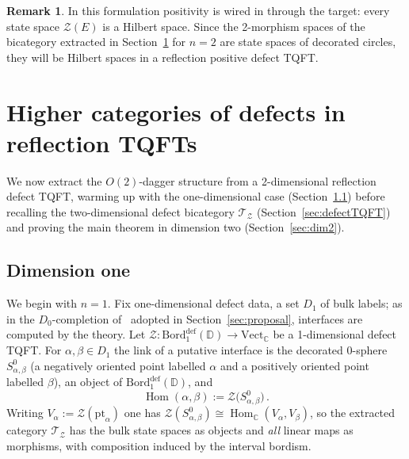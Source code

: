 \documentclass[11pt]{article}
\theoremstyle{definition}
\newtheorem{remark}[theorem]{Remark}
\newcommand{\cT}{\mathcal{T}}
\newcommand{\cZ}{\mathcal{Z}}
\newcommand{\bC}{\mathbb{C}}
\newcommand{\bD}{\mathbb{D}}
\newcommand{\Bord}{\mathrm{Bord}}
\newcommand{\Vect}{\mathrm{Vect}}
\newcommand{\Or}{O} %
\begin{document}
\begin{remark}
\label{rem:positivityforfree}
In this formulation positivity is wired in through the target: every state space $\cZ(E)$ is a Hilbert space. Since the 2-morphism spaces of the bicategory extracted in Section~\ref{sec:extractionsection} for $n = 2$ are state spaces of decorated circles, they will be Hilbert spaces in a reflection positive defect TQFT.
\end{remark}





\section{Higher categories of defects in reflection TQFTs}
\label{sec:extractionsection}

We now extract the $\Or(2)$-dagger structure from a 2-dimensional reflection defect TQFT, warming up with the one-dimensional case (Section~\ref{sec:dim1}) before recalling the two-dimensional defect bicategory $\cT_\cZ$ (Section~\ref{sec:defectTQFT}) and proving the main theorem in dimension two (Section~\ref{sec:dim2}).

\subsection{Dimension one}
\label{sec:dim1}

We begin with $n = 1$. Fix one-dimensional defect data, a set $D_1$ of bulk labels; as in the $D_0$-completion of~\cite[\S 2.4]{CRS18} adopted in Section~\ref{sec:proposal}, interfaces are computed by the theory. Let $\cZ \colon \Bord_1^{\textrm{def}}(\bD)\to \Vect_\bC$ be a 1-dimensional defect TQFT. For $\alpha, \beta \in D_1$ the link of a putative interface is the decorated $0$-sphere $S^0_{\alpha,\beta}$ (a negatively oriented point labelled $\alpha$ and a positively oriented point labelled $\beta$), an object of $\Bord_1^{\textrm{def}}(\bD)$, and
\begin{equation}
	\operatorname{Hom}(\alpha,\beta) := \cZ\big(S^0_{\alpha,\beta}\big) \, .
\end{equation}
 Writing $V_\alpha := \cZ(\mathrm{pt}_\alpha)$ one has $\cZ(S^0_{\alpha,\beta}) \cong \operatorname{Hom}_\bC(V_\alpha, V_\beta)$, so the extracted category $\cT_\cZ$ has the bulk state spaces as objects and \emph{all} linear maps as morphisms, with composition induced by the interval bordism.
\end{document}
